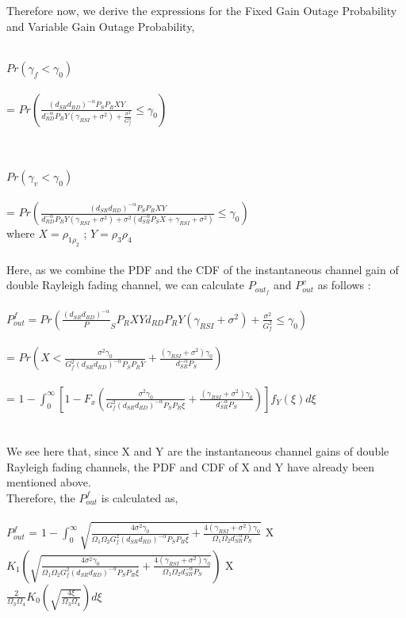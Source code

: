 \documentclass{article}
\begin{document}
\begin{itemize}
\\\\Therefore now, we derive the expressions for the Fixed Gain Outage Probability and Variable Gain Outage Probability,


\\$Pr(\gamma_{f}<\gamma_{0})$
\\\\ = $Pr(\frac{(d_{SR}d_{RD})^{-\alpha}P_{S}P_{R}X Y}{d_{RD}^{-\alpha}P_{R} Y (\gamma_{RSI}+\sigma^{2})+\frac{\sigma^{2}}{G_{f}^{2}}} \leq \gamma_{0})$

\\\\$Pr(\gamma_{v}<\gamma_{0})$
\\\\ = $Pr(\frac{(d_{SR}d_{RD})^{-\alpha}P_{S}P_{R}X Y}{d_{RD}^{-\alpha}P_{R} Y (\gamma_{RSI}+\sigma^{2})+ \sigma^{2}(d_{SR}^{-\alpha}P_{S}X + \gamma_{RSI} + \sigma^{2})} \leq \gamma_{0})$
\\where $X = \rho_{1\rho_{2}}$ ; $Y = \rho_{3}\rho_{4}$
\\\\Here, as we combine the PDF and the CDF of the instantaneous channel gain of double Rayleigh fading channel, we can calculate $P_{out}_{f}$ and $P_{out}^{v}$ as follows : 
\\\\$P_{out}^{f} = Pr(\frac{(d_{SR}d_{RD})^{-\alpha}}P_{S}P_{R}XY{d_{RD}P_{R}Y(\gamma_{RSI} + \sigma^{2}) + \frac{\sigma^{2}}{G_{f}^{2}}} \leq \gamma_{0})$
\\\\ = $Pr(X<\frac{\sigma^{2}\gamma_{0}}{G_{f}^{2}(d_{SR}d_{RD})^{-\alpha}P_{S}P_{R}Y} + \frac{(\gamma_{RSI} + \sigma^{2})\gamma_{0}}{d_{SR}^{-\alpha}P_{S}})$
\\\\ = $1 - \int_{0}^{\infty}[1 - F_{x}(\frac{\sigma^{2}\gamma_{0}}{G_{f}^{2}(d_{SR}d_{RD})^{-\alpha}P_{S}P_{R}\xi} + \frac{(\gamma_{RSI} + \sigma^{2})\gamma_{0}}{d_{SR}^{-\alpha}P_{S}})]f_{Y}(\xi)d\xi$
\\
\\\\We see here that, since X and Y are the instantaneous channel gains of double Rayleigh fading channels, the PDF and CDF of X and Y have already been mentioned above.
\\Therefore, the $P_{out}^{f}$ is calculated as,
\\\\$P_{out}^{f}$ = $1 - \int_{0}^{\infty}\sqrt{\frac{4 \sigma^{2}\gamma_{0}}{\Omega_{1}\Omega_{2}G_{f}^{2}(d_{SR}d_{RD})^{-\alpha}P_{S}P_{R}\xi} + \frac{4(\gamma_{RSI} + \sigma^{2})\gamma_{0}}{\Omega_{1}\Omega_{2}d_{SR}^{-\alpha}P_{S}}}$ X $ K_{1}(\sqrt{\frac{4\sigma^{2}\gamma_{0}}{\Omega_{1}\Omega_{2}G_{f}^{2}(d_{SR}d_{RD})^{-\alpha}P_{S}P_{R}\xi} + \frac{4(\gamma_{RSI} + \sigma^{2})\gamma_{0}}{\Omega_{1}\Omega_{2}d_{SR}^{-\alpha}P_{S}}})$ X \\$\frac{2}{\Omega_{3}\Omega_{4}}K_{0}(\sqrt{\frac{4\xi}{\Omega_{3}\Omega_{4}}})d\xi$

\end{itemize}
\end{document}
